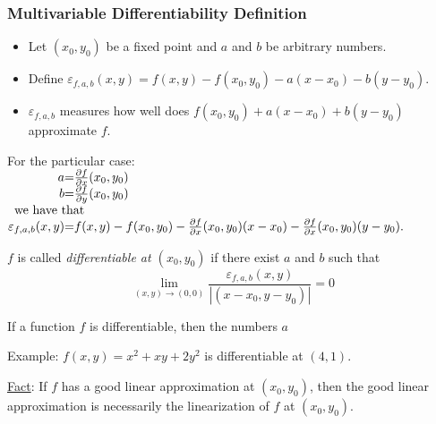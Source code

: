 \begin{frame}
\frametitle{Multivariable Differentiability Definition}

\begin{itemize}
\item Let $(x_0,y_0)$ be a fixed point and $a$ and $b$ be arbitrary numbers.
\item Define $\varepsilon_{f, a, b}(x,y) = f(x,y)- f(x_0,y_0)-a (x-x_0) -b(y-y_0)$.
\item $\varepsilon_{f, a, b}$ measures how well does $f(x_0,y_0)+a(x-x_0)+b(y-y_0)$ approximate $f$.
\end{itemize}
For the particular case:
$
\begin{array}{@{}r@{}c@{}l@{}}
a&=&\frac{\partial f}{\partial x}(x_0,y_0) \\
b&=&\frac{\partial f}{\partial y}(x_0,y_0)\\
\multicolumn{3}{l}{\text{we have that}}\\
\varepsilon_{f, a, b}(x,y) &=& f(x,y)- f(x_0,y_0)-\frac{\partial f}{\partial x}(x_0,y_0) (x-x_0) -\frac{\partial f}{\partial x}(x_0,y_0)(y-y_0).
\end{array}
$

 
\begin{definition}
$f$ is called \emph{differentiable at $(x_0,y_0)$} if there exist $a$ and $b$ such that \[\lim_{(x,y)\to (0,0)}  \frac{\varepsilon_{f, a, b} (x,y)}{|(x-x_0, y-y_0)|}=0 \]
\end{definition}
\begin{observation}
If a function $f$ is differentiable, then the numbers $a$
\end{observation}

\pause Example: $f(x,y) = x^2+xy+2y^2$ is differentiable at $(4,1)$.

\medskip

\pause \underline{Fact}: If $f$ has a good linear approximation at $(x_0,y_0)$, then the good linear approximation is necessarily the linearization of $f$ at $(x_0,y_0)$.
\end{frame}